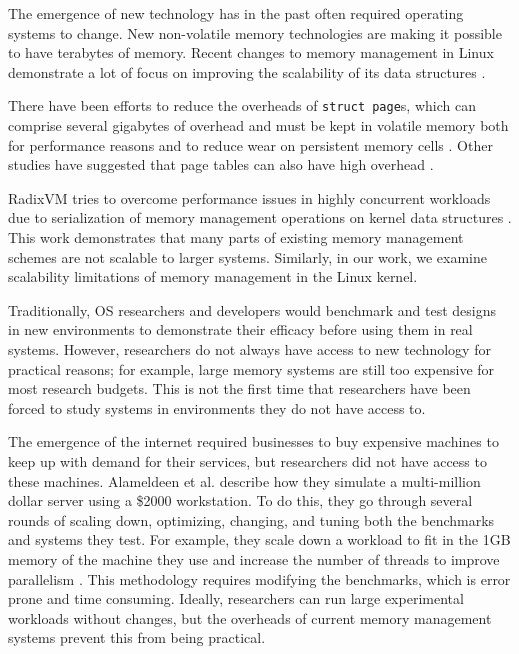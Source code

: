 \documentclass[twocolumn,11pt]{article}
\begin{document}
The emergence of new technology has in the past often required operating systems
to change. New non-volatile memory technologies are making it possible to have
terabytes of memory. Recent changes to memory management in Linux demonstrate a
lot of focus on improving the scalability of its data structures
\cite{huang2016evolutionary}. 

There have been efforts to reduce the
overheads of \texttt{struct page}s, which can comprise several gigabytes of
overhead and must be kept in volatile memory both for performance reasons and to
reduce wear on persistent memory cells \cite{corbet_persistent_progress,
struct_page}. Other studies have suggested that page tables can also have high
overhead \cite{simics}.

RadixVM tries to overcome performance issues in highly
concurrent workloads due to serialization of memory management operations on
kernel data structures \cite{radixvm}. This work demonstrates that many parts of
existing memory management schemes are not scalable to larger systems.
Similarly, in our work, we examine scalability limitations of memory
management in the Linux kernel. 

Traditionally, OS researchers and developers would benchmark and test 
designs in new environments to demonstrate their efficacy before using them in
real systems. However, researchers do not always have access to new technology
for practical reasons; for example, large memory systems are still too expensive
for most research budgets. This is not the first time that researchers have been
forced to study systems in environments they do not have access to.

The emergence of the internet required businesses to buy expensive machines to
keep up with demand for their services, but researchers did not have
access to these machines. Alameldeen et al. describe how they simulate a
multi-million dollar server using a \$2000 workstation. To do this, they go
through several rounds of scaling down, optimizing, changing, and tuning both
the benchmarks and systems they test. For example, they scale down a workload
to fit in the 1GB memory of the machine they use and increase the number of
threads to improve parallelism \cite{2kmachine}. This methodology requires modifying the benchmarks, which is error prone and
time consuming.  Ideally, researchers can run large experimental workloads
without changes, but the overheads of current memory management systems prevent
this from being practical.

\end{document}
